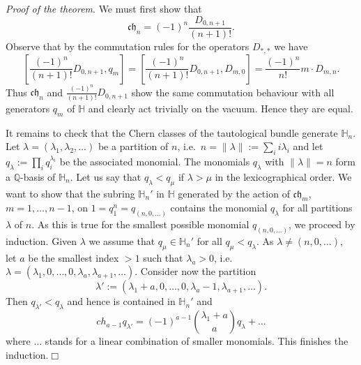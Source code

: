 \documentclass[twoside,11pt]{article}
\newcommand{\prfofthetheorem}{{\kursiv Proof of the theorem}. }
\newcommand{\qed}{\hspace*{\fill}$\Box$\vspace{2ex}}
\newcommand{\kursiv}{\sl}
\newcommand{\IH}{{\mathbb H}}
\newcommand{\IQ}{{\mathbb Q}}
\newcommand{\gothc}{{\mathfrak c}}
\newcommand{\gothh}{{\mathfrak h}}
\newcommand{\ch}{{\gothc\gothh}}
\begin{document}
\medskip

\prfofthetheorem We must first show that 
$$\ch_n=(-1)^n\frac{D_{0,n+1}}{(n+1)!}.$$
Observe that by the commutation rules for the operators $D_{*,*}$ we have
$$[\frac{(-1)^n}{(n+1)!}D_{0,n+1},q_m]=[\frac{(-1)^n}{(n+1)!}D_{0,n+1},D_{m,0}]
=\frac{(-1)^n}{n!}m\cdot D_{m,n}.$$
Thus $\ch_n$ and $\frac{(-1)^n}{(n+1)!}D_{0,n+1}$ show the same commutation
behaviour with all generators $q_m$ of $\IH$ and clearly act trivially on the
vacuum. Hence they are equal.

It remains to check that the Chern classes of the tautological bundle generate
$\IH_n$. Let $\lambda=(\lambda_1,\lambda_2,\ldots)$ be a partition of $n$,
i.e.\ $n=\|\lambda\|:=\sum_ii\lambda_i$ and let
$q_\lambda:=\prod_iq_i^{\lambda_i}$ be the associated monomial.
The monomials $q_\lambda$ with $\|\lambda\|=n$ form a $\IQ$-basis of $\IH_n$.
Let us say that $q_\lambda<q_\mu$ if $\lambda>\mu$ in the lexicographical order. We want to show that the subring $\IH_n'$ in $\IH$ generated
by the action of $\ch_m$, $m=1,\ldots,n-1$, on $1=q_1^n=q_{(n,0,\ldots)}$ 
contains the monomial $q_\lambda$ for all partitions $\lambda$ of $n$. As
this is true for the smallest possible monomial $q_{(n,0,\ldots)}$, we proceed
by induction. Given $\lambda$ we assume that $q_{\mu}\in\IH_n'$ for all $q_\mu<q_\lambda$. As $\lambda\neq(n,0,\ldots)$,
let $a$ be the smallest index $>1$ such that $\lambda_a>0$, i.e.\ $\lambda=(\lambda_1,0,\ldots,0,\lambda_a,\lambda_{a+1},\ldots).$
Consider now the partition
$$\lambda':=(\lambda_1+a,0,\ldots,0,\lambda_a-1,\lambda_{a+1},\ldots).$$
Then $q_{\lambda'}<q_{\lambda}$ and hence is contained in $\IH_n'$ and
$$ch_{a-1}q_{\lambda'}=(-1)^{a-1}\binom{\lambda_1+a}{a}q_\lambda+\ldots$$
where $\ldots$ stands for a linear combination of smaller monomials.
This finishes the induction.\qed



 
%
%
\end{document}
